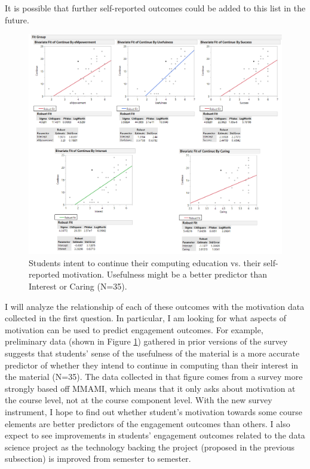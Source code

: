     It is possible that further self-reported outcomes could be added to this list in the future.
    
    \begin{figure}
    \begin{center}
    	\includegraphics[width=\linewidth]{images/continue-vs-motivation.png}
    \end{center}
    \caption{Students intent to continue their computing education vs. their self-reported motivation. Usefulness might be a better predictor than Interest or Caring (N=35).}
    \label{fig-continue-motivation}
\end{figure}
    
    I will analyze the relationship of each of these outcomes with the motivation data collected in the first question. In particular, I am looking for what aspects of motivation can be used to predict engagement outcomes.
    For example, preliminary data (shown in Figure \ref{fig-continue-motivation}) gathered in prior versions of the survey suggests that students' sense of the usefulness of the material is a more accurate predictor of whether they intend to continue in computing than their interest in the material (N=35).
    The data collected in that figure comes from a survey more strongly based off MMAMI, which means that it only asks about motivation at the course level, not at the course component level.
    With the new survey instrument, I hope to find out whether student's motivation towards some course elements are better predictors of the engagement outcomes than others.
    I also expect to see improvements in students' engagement outcomes related to the data science project as the technology backing the project (proposed in the previous subsection) is improved from semester to semester.
